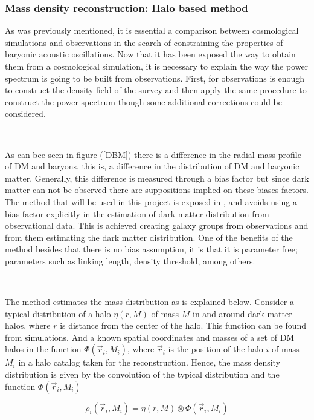 \documentclass[a4,useAMS,usegraphicx,12pt]{article}
\begin{document}
\subsubsection*{ Mass density reconstruction: Halo based method }
\label{subsubsec:HBM}


As was previously mentioned, it is essential a comparison between cosmological simulations and observations 
in the search of constraining the properties of baryonic acoustic oscillations. Now that it has been exposed the 
way to obtain them from a cosmological simulation, it is necessary to explain the way the power spectrum is going 
to be built from observations. First, for observations is enough to construct the density field of the survey and then apply
the same procedure to construct the power spectrum though some additional corrections could be considered. 

\

As can bee seen in figure (\ref{DBM}) there is a difference in the radial mass profile of DM and
baryons, this is, a difference in the distribution of DM and baryonic matter. Generally, this difference is measured 
through a bias factor but since dark matter can not be observed there are suppositions implied on these biases factors. 
The method that will be used in this project is exposed in \cite{HBM}, \cite{HBM01} and avoids using a bias factor explicitly in the estimation of 
dark matter distribution from observational data. This is achieved creating 
galaxy groups from observations and from them estimating the dark matter distribution. 
One of the benefits of the method besides that there is no bias assumption, it is that it is parameter free;  parameters such
as linking length, density threshold, among others. 

\ 

The method estimates the mass distribution as is explained below.  
Consider a typical distribution of a halo  $\eta (r,M)$ of mass $M$ in and around dark matter halos, 
where $r$ is distance from the center of the halo. This function can be found from simulations. 
And a known spatial coordinates and masses of a set of DM halos in the function $\Phi(\vec{r}_i,M_i)$, where $\vec{r}_i$ is 
the position of the halo $i$ of mass $M_i$ in a halo catalog taken for the reconstruction. 
Hence, the mass density distribution is given by the convolution of the typical 
distribution and the function $\Phi(\vec{r}_i,M_i)$

\[
\rho_i(\vec{r}_i,M_i) = \eta (r,M) \otimes  \Phi(\vec{r}_i,M_i)
\]
\end{document}
